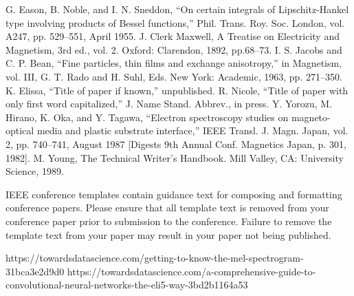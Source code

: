 \documentclass[conference]{IEEEtran}
\begin{document}
\begin{thebibliography}{00}
 G. Eason, B. Noble, and I. N. Sneddon, ``On certain integrals of Lipschitz-Hankel type involving products of Bessel functions,'' Phil. Trans. Roy. Soc. London, vol. A247, pp. 529--551, April 1955.
 J. Clerk Maxwell, A Treatise on Electricity and Magnetism, 3rd ed., vol. 2. Oxford: Clarendon, 1892, pp.68--73.
 I. S. Jacobs and C. P. Bean, ``Fine particles, thin films and exchange anisotropy,'' in Magnetism, vol. III, G. T. Rado and H. Suhl, Eds. New York: Academic, 1963, pp. 271--350.
 K. Elissa, ``Title of paper if known,'' unpublished.
 R. Nicole, ``Title of paper with only first word capitalized,'' J. Name Stand. Abbrev., in press.
 Y. Yorozu, M. Hirano, K. Oka, and Y. Tagawa, ``Electron spectroscopy studies on magneto-optical media and plastic substrate interface,'' IEEE Transl. J. Magn. Japan, vol. 2, pp. 740--741, August 1987 [Digests 9th Annual Conf. Magnetics Japan, p. 301, 1982].
 M. Young, The Technical Writer's Handbook. Mill Valley, CA: University Science, 1989.
\end{thebibliography}
\vspace{12pt}
\color{red}
IEEE conference templates contain guidance text for composing and formatting conference papers. Please ensure that all template text is removed from your conference paper prior to submission to the conference. Failure to remove the template text from your paper may result in your paper not being published.

https://towardsdatascience.com/getting-to-know-the-mel-spectrogram-31bca3e2d9d0
https://towardsdatascience.com/a-comprehensive-guide-to-convolutional-neural-networks-the-eli5-way-3bd2b1164a53
\end{document}
